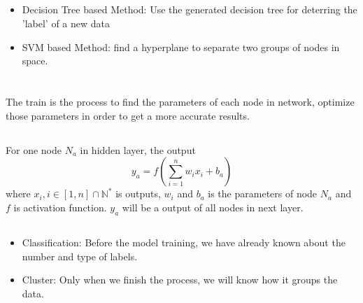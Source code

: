 \documentclass{article}
\begin{document}
        \subsection{}
            \begin{itemize}
                \item Decision Tree based Method: Use the generated decision tree for deterring the 'label' of a new data
                \item SVM based Method: find a hyperplane to separate two groups of nodes in space.
            \end{itemize}
    \section{}
        \subsection{}
            \paragraph{}
            The train is the process to find the parameters of each node in network, optimize those parameters in order to get a more accurate results.
        \subsection{}
            \paragraph{}
            For one node $N_a$ in hidden layer, the output
            $$y_a=f(\sum_{i=1}^n w_ix_i+b_a)$$
            where $x_i, i\in[1,n]\cap \mathbb{N}^{*}$ is outputs, $w_i$ and $b_a$ is the parameters of node $N_a$ and $f$ is activation function. $y_a$ will be a output of all nodes in next layer.
        \subsection{}
            \begin{itemize}
                \item Classification: Before the model training, we have already known about the number and type of labels.
                \item Cluster: Only when we finish the process, we will know how it groups the data.
            \end{itemize}
\end{document}
